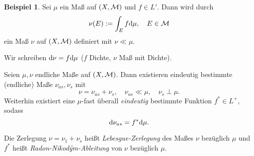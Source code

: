 \documentclass[
 a4paper,
 12pt,
 parskip=half
 ]{scrreprt}
\theoremstyle{plain}
\theoremstyle{definition}
\newtheorem{exmp}[thm]{Beispiel}
\numberwithin{equation}{section}
\begin{document}
\begin{exmp}
  Sei $\mu$ ein Maß auf $(X,\mathcal{M})$ und $f \in L'$. Dann wird durch
  \[ \nu(E) := \int_E f \mathrm{d} \mu, \quad E \in \mathcal{M} \]
  ein Maß $\nu$ auf $(X,\mathcal{M})$ definiert mit $\nu \ll \mu$.

  Wir schreiben $\mathrm{d} \nu = f \mathrm{d} \mu$ ($f$ Dichte, $\nu$ Maß mit Dichte).
\end{exmp}

\begin{thm}
  Seien $\mu, \nu$ endliche Maße auf $(X,\mathcal{M})$. Dann existieren eindeutig
  bestimmte (endliche) Maße $\nu_{as}, \nu_s$ mit
  \[ \nu = \nu_{as} + \nu_s, \quad \nu_{as} \ll \mu, \quad \nu_s \perp \mu. \]
  Weiterhin existiert eine $\mu$-fast überall \emph{eindeutig} bestimmte
  Funktion $f^* \in L^+$, sodass
  \[ \mathrm{d} \nu_{as} = f^* \mathrm{d} \mu. \]
\end{thm}

Die Zerlegung $\nu = \nu_1 + \nu_s$ heißt \emph{Lebesgue-Zerlegung} des Maßes
$\nu$ bezüglich $\mu$ und $f^*$ heißt \emph{Radon-Nikod\'{y}m-Ableitung} von
$\nu$ bezüglich $\mu$.
\end{document}
